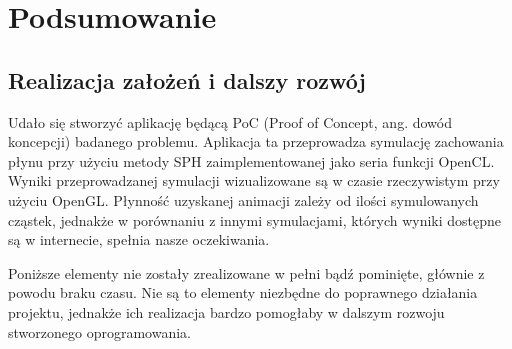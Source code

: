 \documentclass[polish, 12pt]{aghthesis}
\begin{document}
\section{Podsumowanie}

	\subsection{Realizacja założeń i dalszy rozwój}
	
		Udało się stworzyć aplikację będącą PoC (Proof of Concept, ang. dowód koncepcji) badanego problemu. Aplikacja ta przeprowadza symulację zachowania płynu przy użyciu metody SPH zaimplementowanej jako seria funkcji OpenCL. Wyniki przeprowadzanej symulacji wizualizowane są w czasie rzeczywistym przy użyciu OpenGL. Płynność uzyskanej animacji zależy od ilości symulowanych cząstek, jednakże w porównaniu z innymi symulacjami, których wyniki dostępne są w internecie, spełnia nasze oczekiwania.
		
		Poniższe elementy nie zostały zrealizowane w pełni bądź pominięte, głównie z powodu braku czasu. Nie są to elementy niezbędne do poprawnego działania projektu, jednakże ich realizacja bardzo pomogłaby w dalszym rozwoju stworzonego oprogramowania.
		
\end{document}
